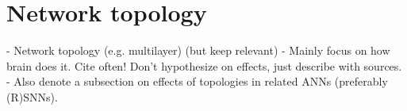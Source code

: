 \section{Network topology}

    \begin{tcolorbox}[colback=orange]
      - Network topology (e.g. multilayer) (but keep relevant)
      - Mainly focus on how brain does it. Cite often! Don't hypothesize on effects, just describe with sources.
      - Also denote a subsection on effects of topologies in related ANNs (preferably (R)SNNs).
    \vspace{15cm}

    \end{tcolorbox}
